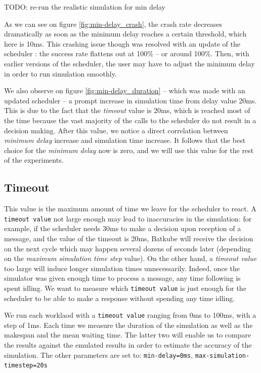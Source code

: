 \documentclass[12pt, a4paper]{memoir}
\begin{document}
TODO: re-run the realistic simulation for min delay

As we can see on figure \ref{fig:min-delay_crash}, the crash rate decreases
dramatically as soon as the minimum delay reaches a certain threshold, which
here is 10ms.  This crashing issue though was resolved with an update of the
scheduler : the success rate flattens out at 100\% -- or around 100\%. Then,
with earlier versions of the scheduler, the user may have to adjust the minimum
delay in order to run simulation smoothly. 

We also observe on figure \ref{fig:min-delay_duration} -- which was made with
an updated scheduler -- a prompt increase in simulation time from delay value
20ms. This is due to the fact that the \textit{timeout} value is 20ms, which is
reached most of the time because the vast majority of the calls to the
scheduler do not result in a decision making. After this value, we notice a
direct correlation between \textit{minimum delay} increase and simulation time
increase. It follows that the best choice for the \textit{minimum delay} now is
zero, and we will use this value for the rest of the experiments.

\subsection{Timeout}

This value is the maximum amount of time we leave for the scheduler to react. A
\texttt{timeout value} not large enough may lead to inaccuracies in the
simulation: for example, if the scheduler needs 30ms to make a decision upon
reception of a message, and the value of the timeout is 20ms, Batkube will
receive the decision on the next cycle which may happen several dozens of
seconds later (depending on the \textit{maximum simulation time step} value).
On the other hand, a \textit{timeout value} too large will induce longer
simulation times unnecessarily. Indeed, once the simulator was given enough
time to process a message, any time following is spent idling. We want to
measure which \texttt{timeout value} is just enough for the scheduler to be
able to make a response without spending any time idling.

We run each worklaod with a \texttt{timeout value} ranging from 0ms to 100ms,
with a step of 1ms. Each time we measure the duration of the simulation as well
as the makespan and the mean waiting time. The latter two will enable us to
compare the results against the emulated results in order to estimate the
accuracy of the simulation. The other parameters are set to:
\texttt{min-delay=0ms}, \texttt{max-simulation-timestep=20s}
\end{document}
